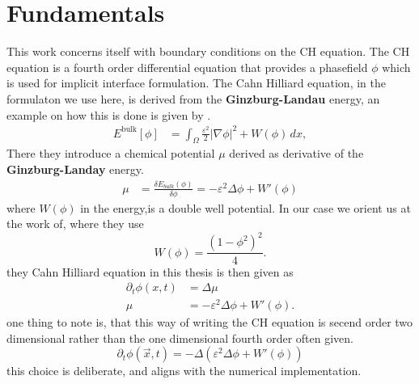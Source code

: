 \documentclass{mimosis}
\begin{document}
\chapter{Fundamentals}
\label{sec:org3667db3}
This work concerns itself with boundary conditions on the CH equation. The CH equation is a fourth order differential equation that provides a phasefield \(\phi\) which is used for implicit interface formulation. The Cahn Hilliard equation, in the formulaton we use here, is derived from the \textbf{Ginzburg-Landau} energy, an example on how this is done is given by \autocite{Wu_2022}.
\begin{align}
\label{eq:energy}
E^{\text{bulk}}[\phi] &= \int_{\Omega} \frac{\varepsilon^2}{2} |\nabla \phi |^2 + W(\phi) \, dx ,
\end{align}
There they introduce a chemical potential \(\mu\) derived as derivative of the \textbf{Ginzburg-Landay} energy.
\begin{align}
\label{eq:chemical-potential}
 \mu &= \frac{\delta E_{bulk}(\phi)}{\delta \phi} = -\varepsilon^2 \Delta \phi + W'(\phi)
\end{align}
where \(W(\phi)\) in the energy,is a double well potential. In our case we orient us at the work of\autocite{SHIN20117441}, where they use
\begin{equation}
\label{eq:6}
W(\phi) = \frac{(1-\phi^2)^2}{4}.
\end{equation}
they Cahn Hilliard equation in this thesis is then given as
\begin{equation}
\begin{aligned}
\partial_{t}\phi(x,t) &=  \Delta\mu \\
\mu &= - \varepsilon^2 \Delta\phi  + W'(\phi).
\end{aligned}
\end{equation}
one thing to note is, that this way of writing the CH equation is secend order two dimensional rather than the one dimensional fourth order often given.
\begin{equation}
\label{eq:7}
\partial_t \phi(\vec{x} , t) = - \Delta(\varepsilon^2  \Delta \phi + W\prime(\phi))
\end{equation}
this choice is deliberate, and aligns with the numerical implementation.
\end{document}
